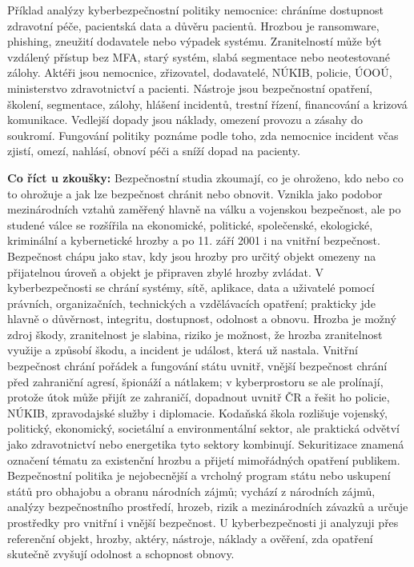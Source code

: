 \documentclass[11pt,a4paper]{article}
\newcommand{\zkouska}[1]{\begin{tcolorbox}[breakable,enhanced,colback=blue!7,colframe=blue!30!black,boxrule=0pt,arc=1mm,left=5pt,right=5pt,top=5pt,bottom=5pt,before skip=6pt,after skip=6pt]\textbf{Co říct u zkoušky:} #1\end{tcolorbox}}
\begin{document}
Příklad analýzy kyberbezpečnostní politiky nemocnice: chráníme dostupnost zdravotní péče, pacientská data a důvěru pacientů. Hrozbou je ransomware, phishing, zneužití dodavatele nebo výpadek systému. Zranitelností může být vzdálený přístup bez MFA, starý systém, slabá segmentace nebo neotestované zálohy. Aktéři jsou nemocnice, zřizovatel, dodavatelé, NÚKIB, policie, ÚOOÚ, ministerstvo zdravotnictví a pacienti. Nástroje jsou bezpečnostní opatření, školení, segmentace, zálohy, hlášení incidentů, trestní řízení, financování a krizová komunikace. Vedlejší dopady jsou náklady, omezení provozu a zásahy do soukromí. Fungování politiky poznáme podle toho, zda nemocnice incident včas zjistí, omezí, nahlásí, obnoví péči a sníží dopad na pacienty.

\zkouska{Bezpečnostní studia zkoumají, co je ohroženo, kdo nebo co to ohrožuje a jak lze bezpečnost chránit nebo obnovit. Vznikla jako podobor mezinárodních vztahů zaměřený hlavně na válku a vojenskou bezpečnost, ale po studené válce se rozšířila na ekonomické, politické, společenské, ekologické, kriminální a kybernetické hrozby a po 11. září 2001 i na vnitřní bezpečnost. Bezpečnost chápu jako stav, kdy jsou hrozby pro určitý objekt omezeny na přijatelnou úroveň a objekt je připraven zbylé hrozby zvládat. V kyberbezpečnosti se chrání systémy, sítě, aplikace, data a uživatelé pomocí právních, organizačních, technických a vzdělávacích opatření; prakticky jde hlavně o důvěrnost, integritu, dostupnost, odolnost a obnovu. Hrozba je možný zdroj škody, zranitelnost je slabina, riziko je možnost, že hrozba zranitelnost využije a způsobí škodu, a incident je událost, která už nastala. Vnitřní bezpečnost chrání pořádek a fungování státu uvnitř, vnější bezpečnost chrání před zahraniční agresí, špionáží a nátlakem; v kyberprostoru se ale prolínají, protože útok může přijít ze zahraničí, dopadnout uvnitř ČR a řešit ho policie, NÚKIB, zpravodajské služby i diplomacie. Kodaňská škola rozlišuje vojenský, politický, ekonomický, societální a environmentální sektor, ale praktická odvětví jako zdravotnictví nebo energetika tyto sektory kombinují. Sekuritizace znamená označení tématu za existenční hrozbu a přijetí mimořádných opatření publikem. Bezpečnostní politika je nejobecnější a vrcholný program státu nebo uskupení států pro obhajobu a obranu národních zájmů; vychází z národních zájmů, analýzy bezpečnostního prostředí, hrozeb, rizik a mezinárodních závazků a určuje prostředky pro vnitřní i vnější bezpečnost. U kyberbezpečnosti ji analyzuji přes referenční objekt, hrozby, aktéry, nástroje, náklady a ověření, zda opatření skutečně zvyšují odolnost a schopnost obnovy.}
\end{document}
